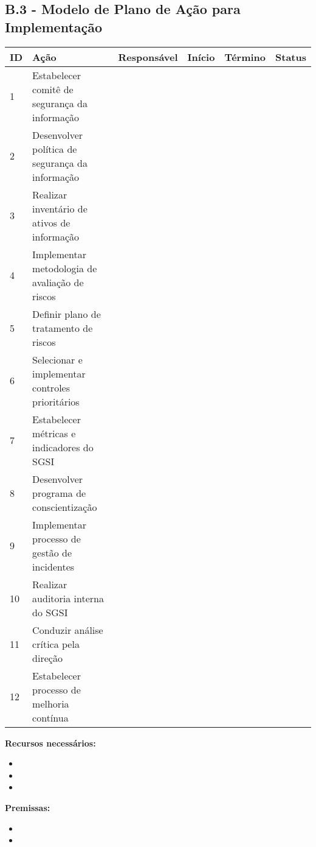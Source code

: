 \documentclass[12pt,a4paper]{report}
\begin{document}
\subsection{B.3 - Modelo de Plano de Ação para Implementação}

\begin{tcolorbox}[colback=boxcolor,colframe=sectioncolor,arc=2mm,title=\textbf{PLANO DE AÇÃO PARA IMPLEMENTAÇÃO DO SGSI}]

\begin{tabular}{|p{1cm}|p{4cm}|p{2.5cm}|p{2cm}|p{2cm}|p{2.5cm}|}
\hline
\textbf{ID} & \textbf{Ação} & \textbf{Responsável} & \textbf{Início} & \textbf{Término} & \textbf{Status} \\
\hline
\hline
1 & Estabelecer comitê de segurança da informação & & & & \\
\hline
2 & Desenvolver política de segurança da informação & & & & \\
\hline
3 & Realizar inventário de ativos de informação & & & & \\
\hline
4 & Implementar metodologia de avaliação de riscos & & & & \\
\hline
5 & Definir plano de tratamento de riscos & & & & \\
\hline
6 & Selecionar e implementar controles prioritários & & & & \\
\hline
7 & Estabelecer métricas e indicadores do SGSI & & & & \\
\hline
8 & Desenvolver programa de conscientização & & & & \\
\hline
9 & Implementar processo de gestão de incidentes & & & & \\
\hline
10 & Realizar auditoria interna do SGSI & & & & \\
\hline
11 & Conduzir análise crítica pela direção & & & & \\
\hline
12 & Estabelecer processo de melhoria contínua & & & & \\
\hline
\end{tabular}

\textbf{Recursos necessários:}
\begin{itemize}
  \item 
  \item 
  \item 
\end{itemize}

\textbf{Premissas:}
\begin{itemize}
  \item 
  \item 
\end{itemize}


\end{tcolorbox}
\end{document}
